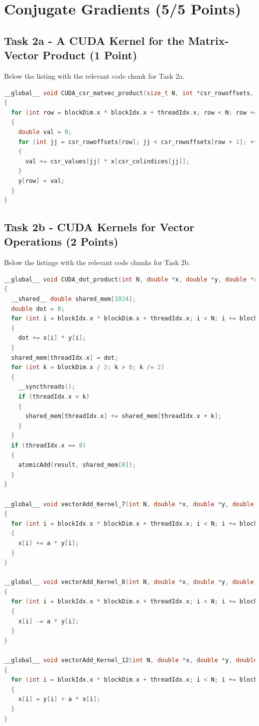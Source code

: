 \section{Conjugate Gradients (5/5 Points)}

\subsection{Task 2a - A CUDA Kernel for the Matrix-Vector Product (1 Point)}
Below the listing with the relevant code chunk for Task 2a.
\begin{lstlisting}[language=C++, title=C++ Cuda Code for 1a Kernel]
__global__ void CUDA_csr_matvec_product(size_t N, int *csr_rowoffsets, int *csr_colindices, double *csr_values, double *x, double *y)
{
  for (int row = blockDim.x * blockIdx.x + threadIdx.x; row < N; row += gridDim.x * blockDim.x)
  {
    double val = 0;
    for (int jj = csr_rowoffsets[row]; jj < csr_rowoffsets[row + 1]; ++jj)
    {
      val += csr_values[jj] * x[csr_colindices[jj]];
    }
    y[row] = val;
  }
}
\end{lstlisting}



\pagebreak


\subsection{Task 2b - CUDA Kernels for Vector Operations (2 Points)}
Below the listings with the relevant code chunks for Task 2b.
\begin{lstlisting}[language=C++, title=C++ Cuda Code for 1a Kernel]
__global__ void CUDA_dot_product(int N, double *x, double *y, double *result)
{
  __shared__ double shared_mem[1024];
  double dot = 0;
  for (int i = blockIdx.x * blockDim.x + threadIdx.x; i < N; i += blockDim.x * gridDim.x)
  {
    dot += x[i] * y[i];
  }
  shared_mem[threadIdx.x] = dot;
  for (int k = blockDim.x / 2; k > 0; k /= 2)
  {
    __syncthreads();
    if (threadIdx.x < k)
    {
      shared_mem[threadIdx.x] += shared_mem[threadIdx.x + k];
    }
  }
  if (threadIdx.x == 0)
  {
    atomicAdd(result, shared_mem[0]);
  }
}

__global__ void vectorAdd_Kernel_7(int N, double *x, double *y, double a)
{
  for (int i = blockIdx.x * blockDim.x + threadIdx.x; i < N; i += blockDim.x * gridDim.x)
  {
    x[i] += a * y[i];
  }
}

__global__ void vectorAdd_Kernel_8(int N, double *x, double *y, double a)
{
  for (int i = blockIdx.x * blockDim.x + threadIdx.x; i < N; i += blockDim.x * gridDim.x)
  {
    x[i] -= a * y[i];
  }
}

__global__ void vectorAdd_Kernel_12(int N, double *x, double *y, double a)
{
  for (int i = blockIdx.x * blockDim.x + threadIdx.x; i < N; i += blockDim.x * gridDim.x)
  {
    x[i] = y[i] + a * x[i];
  }
}
\end{lstlisting}

